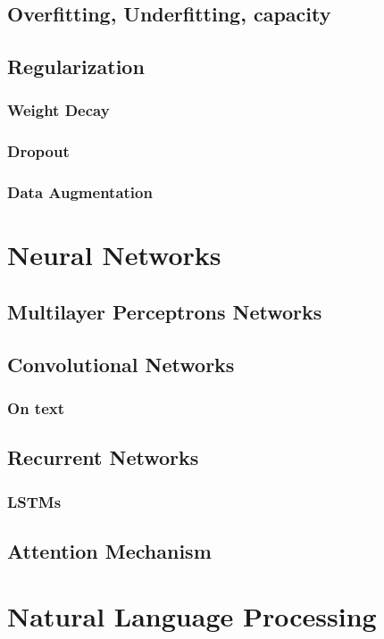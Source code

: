 \documentclass[12pt]{article}
\begin{document}
\subsection{Overfitting, Underfitting, capacity}
\subsection{Regularization}
\subsubsection{Weight Decay}
\subsubsection{Dropout}
\subsubsection{Data Augmentation}

\section{Neural Networks}
    \subsection{Multilayer Perceptrons Networks}
    \subsection{Convolutional Networks}
        \subsubsection{On text}
    \subsection{Recurrent Networks}
        \subsubsection{LSTMs}
    \subsection{Attention Mechanism}

\section{Natural Language Processing}
\end{document}
